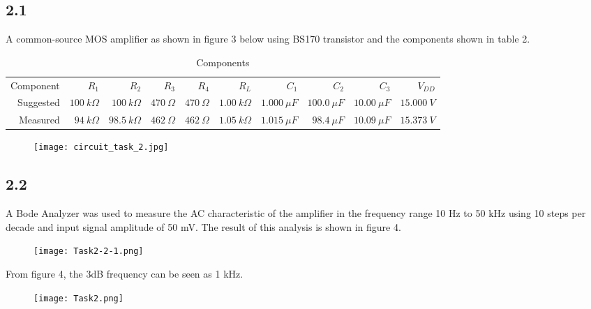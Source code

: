 \subsection*{2.1}
A common-source MOS amplifier as shown in figure 3 below using BS170 transistor and the components shown in table 2.

\begin{table}[htbp]
   \centering
   \caption{Components}
     \begin{tabular}{rrrrrrrrrr}
     Component   & $R_1$       & $R_2$       & $R_3$       & $R_4$       & $R_L$       & $C_1$       & $C_2$       & $C_3$       & $V_{DD}$ \\
     Suggested & $100 \ k \Omega$ & $100 \ k \Omega$ & $470 \ \Omega$ & $470 \ \Omega$ & $1.00 \ k \Omega$ & $1.000 \ \mu F$ & $100.0 \ \mu F$ & $10.00 \ \mu F$ & $15.000 \ V$ \\
     Measured    & $94 \ k \Omega$ & $98.5 \ k \Omega$ & $462 \ \Omega$ & $462 \ \Omega$ & $1.05 \ k \Omega$ & $1.015 \ \mu F$ & $98.4 \ \mu F$ & $10.09 \ \mu F$ & $15.373 \ V$ \\
     \end{tabular}%
   \label{tab:addlabel}%
\end{table}%


    \begin{figure}[h!]
        \centering
        \texttt{[image: circuit\_task\_2.jpg]}
    \end{figure}


\pagebreak
\subsection*{2.2}


A Bode Analyzer was used to measure the AC characteristic of the amplifier in the frequency range 10 Hz to 50 kHz using 10 steps per decade and input signal amplitude of 50 mV. The result of this analysis is shown in figure 4.

    \begin{figure}[h!]
        \centering
        \texttt{[image: Task2-2-1.png]}
    \end{figure}
From figure 4, the 3dB frequency can be seen as 1 kHz.
    \begin{figure}[h!]
        \centering
        \texttt{[image: Task2.png]}
    \end{figure}

